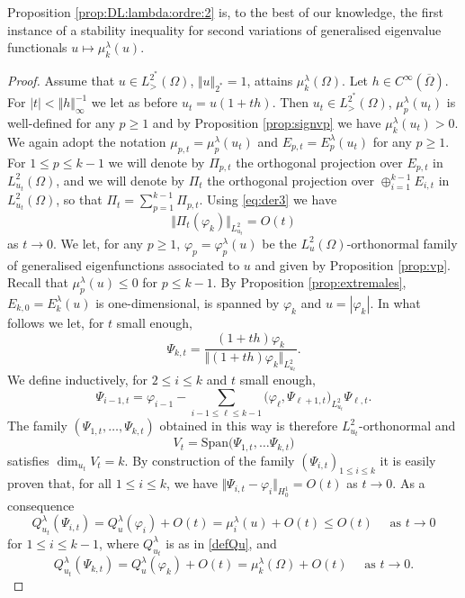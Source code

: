\documentclass[10pt]{amsart}
\numberwithin{equation}{section}
\newcommand{\vp}{\varphi}
\newcommand{\Om}{\Omega}
\newcommand{\mkl}{\mu_{k}^{\lambda}}
\newcommand{\mpl}{\mu_{p}^{\lambda}}
\theoremstyle{plain}
\theoremstyle{remark}
\begin{document}
Proposition \ref{prop:DL:lambda:ordre:2} is, to the best of our knowledge, the first instance of a stability inequality for second variations of generalised eigenvalue functionals $u \mapsto \mkl(u)$. 

\begin{proof}
Assume that $u \in L^{2^*}_{>}(\Om)$, $\Vert u \Vert_{2^*} = 1$, attains $\mkl(\Om)$. Let $h \in C^\infty(\overline{\Om})$. For $|t|< \Vert h \Vert_{\infty}^{-1}$ we let as before $u_t = u(1+ th)$. Then $u_t \in L^{2^*}_{>}(\Om)$,  $\mu_p^{\lambda}(u_t)$ is well-defined for any $p \ge 1$ and by Proposition \ref{prop:signvp} we have $\mkl(u_t)>0$. We again adopt the notation $\mu_{p,t} = \mpl(u_t)$ and $E_{p,t} = E_p^{\lambda}(u_t)$ for any $p \ge1$. For $1 \le p \le k-1$ we will denote by $\Pi_{p,t}$ the orthogonal projection over $E_{p,t}$ in $L^2_{u_t}(\Om)$, and we will denote by  $\Pi_t$ the orthogonal projection over $\oplus_{i=1}^{k-1} E_{i,t}$ in $L^2_{u_t}(\Om)$, so that $\Pi_t = \sum_{p=1}^{k-1} \Pi_{p,t}$. Using \eqref{eq:der3} we have 
\begin{equation*}
\Vert \Pi_t(\vp_k) \Vert_{L^2_{u_t}} = O(t) 
\end{equation*}
as  $t \to 0$. 
We let, for any $p \ge 1$,  $\vp_p = \vp_p^{\lambda}(u)$ be the $L^2_u(\Om)$-orthonormal family of generalised eigenfunctions associated to $u$ and given by Proposition \ref{prop:vp}. Recall that $\mpl(u) \le 0$ for $p \le k-1$. By Proposition \ref{prop:extremales}, $E_{k,0} = E_k^{\lambda}(u)$ is one-dimensional, is spanned by $\vp_k$ and $u = |\vp_k|$. In what follows we let, for $t$ small enough,
$$ \Psi_{k,t} = \frac{(1+th) \vp_k}{\Vert (1+th) \vp_k \Vert_{L^2_{u_t}}} .$$
We define inductively, for $2 \le i \le k$ and $t$ small enough,
$$ \Psi_{i-1,t} = \vp_{i-1} - \sum_{i-1 \le \ell \le k-1} \big( \vp_{\ell}, \Psi_{\ell+1,t} \big)_{L^2_{u_t}} \Psi_{\ell,t}. $$
The family $(\Psi_{1,t}, \dots, \Psi_{k,t})$ obtained in this way is therefore $L^2_{u_t}$-orthonormal and 
$$ V_t = \text{Span} \big( \Psi_{1,t}, \dots \Psi_{k,t} \big) $$
satisfies $\dim_{u_t} V_t = k$. By construction of the family $(\Psi_{i,t})_{1 \le i \le k}$ it is easily proven that, for all $1 \le i \le k$, we have $\Vert \Psi_{i,t} - \vp_i \Vert_{H^1_0} = O(t)$ as $t \to 0$. As a consequence
$$ Q_{u_t}^{\lambda}( \Psi_{i,t}) = Q_u^{\lambda}(\vp_i) + O(t) = \mu_i^{\lambda}(u) + O(t)\le O(t) \quad \text{ as } t \to 0$$
for $1 \le i \le k-1$, where $Q_{u_t}^{\lambda}$ is as in \eqref{defQu}, and 
$$ Q_{u_t}^{\lambda}( \Psi_{k,t}) = Q_u^{\lambda}(\vp_k) + O(t) = \mu_k^{\lambda}(\Om) + O(t) \quad \text{ as } t \to 0.$$

\end{proof}
\end{document}
